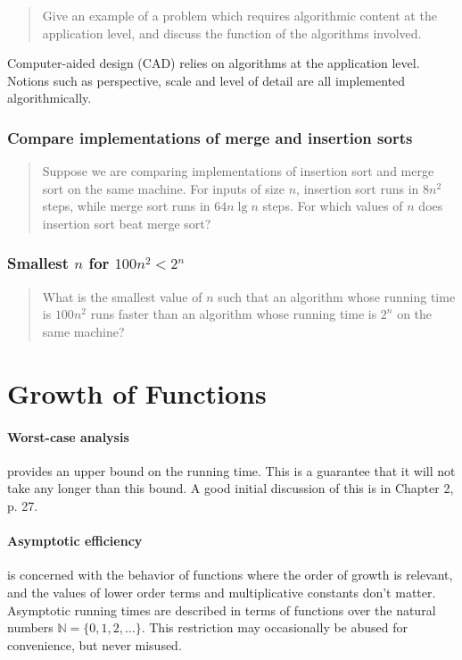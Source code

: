 \documentclass{article}
\begin{document}
\begin{quote}
  Give an example of a problem which requires algorithmic content
  at the application level, and discuss the function of the algorithms
  involved.
\end{quote}

Computer-aided design (CAD) relies on algorithms at the application
level. Notions such as perspective, scale and level of detail are
all implemented algorithmically.

\subsubsection{Compare implementations of merge and insertion sorts}

\begin{quote}
  Suppose we are comparing implementations of insertion sort and merge
  sort on the same machine. For inputs of size $n$, insertion sort runs
  in $8n^2$ steps, while merge sort runs in $64n\lg n$ steps. For which
  values of $n$ does insertion sort beat merge sort?
\end{quote}

\subsubsection{Smallest $n$ for $100n^2 < 2^n$}

\begin{quote}
  What is the smallest value of $n$ such that an algorithm whose running
  time is $100n^2$ runs faster than an algorithm whose running time is
  $2^n$ on the same machine?
\end{quote}

\section{Growth of Functions}\label{sec:growthfunctions}

\paragraph{Worst-case analysis} provides an upper bound on the running time.
This is a guarantee that it will not take any longer than this bound.
A good initial discussion of this is in Chapter 2, p. 27.

\paragraph{Asymptotic efficiency} is concerned with the behavior of functions where the
order of growth is relevant, and the values of lower order terms and multiplicative
constants don't matter.
Asymptotic running times are described in terms of functions over the natural
numbers $\mathbb{N} = \{ 0, 1, 2,\ldots\}$. This restriction may occasionally be
abused for convenience, but never misused.
\end{document}
